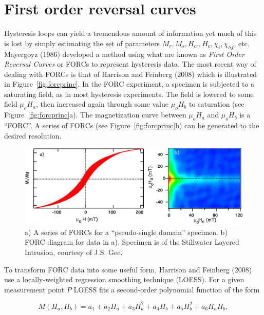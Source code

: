 \section{First order reversal curves}


Hysteresis loops can yield a tremendous amount of  information yet much of this is lost by simply estimating the set of parameters $M_r, M_s,  H_{cr}, H_c, \chi_i, \chi_{hf}$, etc.   
\nocite{mayergoyz86}
Mayergoyz (1986)    developed a method using  what are known as   {\it First Order Reversal Curves} or FORCs to represent hysteresis data.  The most recent way of dealing with
 FORCs is that of
 \nocite{harrison08}
  Harrison and Feinberg (2008)  which is illustrated in Figure~\ref{fig:forcprinc}.  In the FORC experiment,  a specimen is subjected to a saturating field,  as in most hysteresis experiments.  The field is lowered to some field $\mu_oH_a$, then increased again through some value $\mu_oH_b$  to saturation (see Figure~\ref{fig:forcprinc}a).   The magnetization curve between $\mu_o H_a$ and $\mu_oH_b$ is a ``FORC''.  A series of FORCs (see Figure~\ref{fig:forcprinc}b) can be generated to the desired resolution.  


 
 \begin{figure}[h!b]
\centering  \includegraphics[width=14 cm]{EPSfiles/m428.eps}
\caption{a)  A series of FORCs for a ``pseudo-single domain'' specimen.  b) FORC diagram for data in a).   Specimen  is  of the Stillwater Layered Intrusion, courtesy of J.S. Gee.   }
\label{fig:forcpsd}
\end{figure}


To transform FORC data into some useful form, Harrison and Feinberg (2008) use a locally-weighted regression smoothing technique (LOESS).   For a given measurement point $P$ LOESS fits a second-order polynomial function of the form

\begin{equation}
M(H_a,H_b)= a_1 + a_2H_a + a_3H_a^2 + a_4H_b +a_5H_b^2 +a_6H_aH_b,
\label{eq:forc}
\end{equation}

